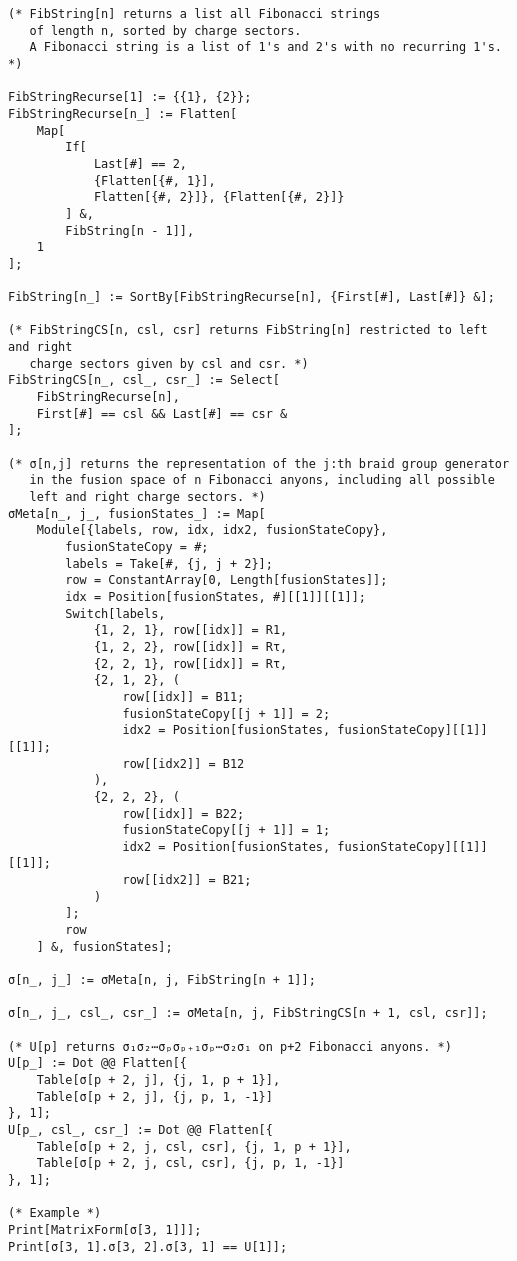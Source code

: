\begin{verbatim}
(* FibString[n] returns a list all Fibonacci strings
   of length n, sorted by charge sectors.
   A Fibonacci string is a list of 1's and 2's with no recurring 1's. *)

FibStringRecurse[1] := {{1}, {2}};
FibStringRecurse[n_] := Flatten[
    Map[
        If[
            Last[#] == 2,
            {Flatten[{#, 1}],
            Flatten[{#, 2}]}, {Flatten[{#, 2}]}
        ] &,
        FibString[n - 1]],
    1
];

FibString[n_] := SortBy[FibStringRecurse[n], {First[#], Last[#]} &];

(* FibStringCS[n, csl, csr] returns FibString[n] restricted to left and right
   charge sectors given by csl and csr. *)
FibStringCS[n_, csl_, csr_] := Select[
    FibStringRecurse[n],
    First[#] == csl && Last[#] == csr &
];

(* σ[n,j] returns the representation of the j:th braid group generator
   in the fusion space of n Fibonacci anyons, including all possible
   left and right charge sectors. *)
σMeta[n_, j_, fusionStates_] := Map[
    Module[{labels, row, idx, idx2, fusionStateCopy},
        fusionStateCopy = #;
        labels = Take[#, {j, j + 2}];
        row = ConstantArray[0, Length[fusionStates]];
        idx = Position[fusionStates, #][[1]][[1]];
        Switch[labels,
            {1, 2, 1}, row[[idx]] = R1,
            {1, 2, 2}, row[[idx]] = Rτ,
            {2, 2, 1}, row[[idx]] = Rτ,
            {2, 1, 2}, (
                row[[idx]] = B11;
                fusionStateCopy[[j + 1]] = 2;
                idx2 = Position[fusionStates, fusionStateCopy][[1]][[1]];
                row[[idx2]] = B12
            ),
            {2, 2, 2}, (
                row[[idx]] = B22;
                fusionStateCopy[[j + 1]] = 1;
                idx2 = Position[fusionStates, fusionStateCopy][[1]][[1]];
                row[[idx2]] = B21;
            )
        ];
        row
    ] &, fusionStates];

σ[n_, j_] := σMeta[n, j, FibString[n + 1]];

σ[n_, j_, csl_, csr_] := σMeta[n, j, FibStringCS[n + 1, csl, csr]];

(* U[p] returns σ₁σ₂⋯σₚσₚ₊₁σₚ⋯σ₂σ₁ on p+2 Fibonacci anyons. *)
U[p_] := Dot @@ Flatten[{
    Table[σ[p + 2, j], {j, 1, p + 1}],
    Table[σ[p + 2, j], {j, p, 1, -1}]
}, 1];
U[p_, csl_, csr_] := Dot @@ Flatten[{
    Table[σ[p + 2, j, csl, csr], {j, 1, p + 1}],
    Table[σ[p + 2, j, csl, csr], {j, p, 1, -1}]
}, 1];

(* Example *)
Print[MatrixForm[σ[3, 1]]];
Print[σ[3, 1].σ[3, 2].σ[3, 1] == U[1]];
\end{verbatim}


